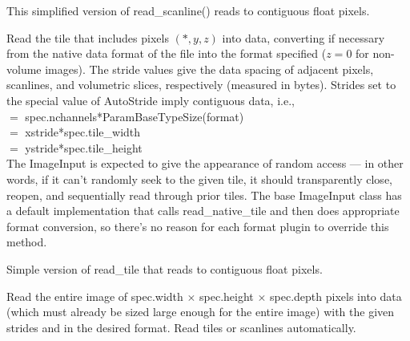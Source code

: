 This simplified version of {\kw read_scanline()} reads to contiguous 
float pixels.
\apiend

Read the tile that includes pixels $(*,y,z)$ into {\kw data}, converting
if necessary from the native data format of the file into the 
{\kw format} specified ($z=0$ for non-volume images).  The stride values
give the data spacing of adjacent pixels, scanlines, and volumetric
slices, respectively (measured in bytes).  Strides set to the special
value of {\kw AutoStride} imply contiguous data, i.e., \\
 $=$ {\kw spec.nchannels*ParamBaseTypeSize(format)} \\
 $=$ {\kw xstride*spec.tile_width} \\
 $=$ {\kw ystride*spec.tile_height} \\
The {\kw ImageInput} is expected to give the appearance of random access
--- in other words, if it can't randomly seek to the given tile, it
should transparently close, reopen, and sequentially read through prior
tiles.  The base {\kw ImageInput} class has a default implementation
that calls read_native_tile and then does appropriate format conversion,
so there's no reason for each format plugin to override this method.
\apiend


Simple version of {\kw read_tile} that reads to contiguous float pixels.
\apiend


Read the entire image of {\kw spec.width} $\times$ {\kw spec.height}
$\times$ {\kw spec.depth}
pixels into data (which must already be sized large enough for
the entire image) with the given strides and in the desired
format.  Read tiles or scanlines automatically.  

